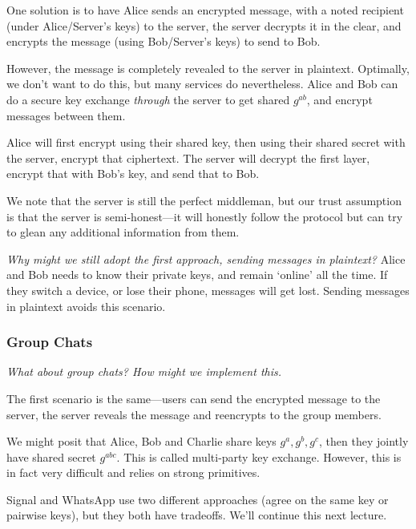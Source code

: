 One solution is to have Alice sends an encrypted message, with a noted recipient (under Alice/Server's keys) to the server, the server decrypts it in the clear, and encrypts the message (using Bob/Server's keys) to send to Bob.


However, the message is completely revealed to the server in plaintext. Optimally, we don't want to do this, but many services do nevertheless. Alice and Bob can do a secure key exchange \emph{through} the server to get shared $g^{ab}$, and encrypt messages between them.

Alice will first encrypt using their shared key, then using their shared secret with the server, encrypt that ciphertext. The server will decrypt the first layer, encrypt that with Bob's key, and send that to Bob.

We note that the server is still the perfect middleman, but our trust assumption is that the server is semi-honest---it will honestly follow the protocol but can try to glean any additional information from them.

\emph{Why might we still adopt the first approach, sending messages in plaintext?} Alice and Bob needs to know their private keys, and remain `online' all the time. If they switch a device, or lose their phone, messages will get lost. Sending messages in plaintext avoids this scenario.

\subsubsection{Group Chats}
\emph{What about group chats? How might we implement this.}


The first scenario is the same---users can send the encrypted message to the server, the server reveals the message and reencrypts to the group members.

We might posit that Alice, Bob and Charlie share keys $g^a, g^b, g^c$, then they jointly have shared secret $g^{abc}$. This is called multi-party key exchange. However, this is in fact very difficult and relies on strong primitives.

Signal and WhatsApp use two different approaches (agree on the same key or pairwise keys), but they both have tradeoffs. We'll continue this next lecture.